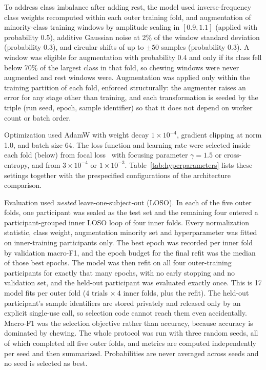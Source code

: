 \documentclass[pdflatex,sn-nature,iicol]{sn-jnl}
\begin{document}
To address class imbalance after adding rest, the model used inverse-frequency class weights recomputed within each outer training fold, and augmentation of minority-class training windows by amplitude scaling in $[0.9, 1.1]$ (applied with probability 0.5), additive Gaussian noise at 2\% of the window standard deviation (probability 0.3), and circular shifts of up to $\pm50$ samples (probability 0.3). A window was eligible for augmentation with probability 0.4 and only if its class fell below 70\% of the largest class in that fold, so chewing windows were never augmented and rest windows were. Augmentation was applied only within the training partition of each fold, enforced structurally: the augmenter raises an error for any stage other than training, and each transformation is seeded by the triple (run seed, epoch, sample identifier) so that it does not depend on worker count or batch order.

Optimization used AdamW with weight decay $1\times10^{-4}$, gradient clipping at norm 1.0, and batch size 64. The loss function and learning rate were selected inside each fold (below) from focal loss~\cite{lin2017focal} with focusing parameter $\gamma = 1.5$ or cross-entropy, and from $3\times10^{-4}$ or $1\times10^{-3}$. Table~\ref{tab:hyperparameters} lists these settings together with the prespecified configurations of the architecture comparison.

Evaluation used \emph{nested} leave-one-subject-out (LOSO). In each of the five outer folds, one participant was sealed as the test set and the remaining four entered a participant-grouped inner LOSO loop of four inner folds. Every normalization statistic, class weight, augmentation minority set and hyperparameter was fitted on inner-training participants only. The best epoch was recorded per inner fold by validation macro-F1, and the epoch budget for the final refit was the median of those best epochs. The model was then refit on all four outer-training participants for exactly that many epochs, with no early stopping and no validation set, and the held-out participant was evaluated exactly once. This is 17 model fits per outer fold ($4$ trials $\times\ 4$ inner folds, plus the refit). The held-out participant's sample identifiers are stored privately and released only by an explicit single-use call, so selection code cannot reach them even accidentally. Macro-F1 was the selection objective rather than accuracy, because accuracy is dominated by chewing. The whole protocol was run with three random seeds, all of which completed all five outer folds, and metrics are computed independently per seed and then summarized. Probabilities are never averaged across seeds and no seed is selected as best.
\end{document}
